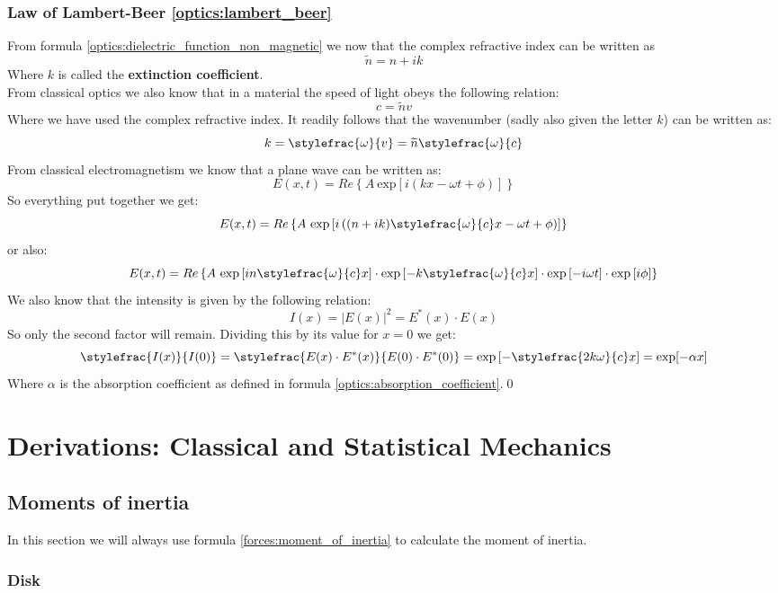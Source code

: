 	\subsection{Law of Lambert-Beer \ref{optics:lambert_beer}}
    From formula \ref{optics:dielectric_function_non_magnetic} we now that the complex refractive index can be written as \[\widetilde{n} = n+ik\]Where $k$ is called the \textbf{extinction coefficient}.
    \\From classical optics we also know that in a material the speed of light obeys the following relation: \[c = \widetilde{n}v\]Where we have used the complex refractive index. It readily follows that the wavenumber (sadly also given the letter $k$) can be written as:\[k = \stylefrac{\omega}{v} = \widetilde{n}\stylefrac{\omega}{c}\]
    From classical electromagnetism we know that a plane wave can be written as:\[E(x, t) = Re\left\{A\ \text{exp}\left[i(kx - \omega t + \phi)\right]\right\}\]
    So everything put together we get:\[E(x, t) = Re\left\{A\ \text{exp}\left[i\left((n+ik)\stylefrac{\omega}{c}x - \omega t + \phi\right)\right]\right\}\]
    or also:\[E(x, t) = Re\left\{A\ \text{exp}\left[in\stylefrac{\omega}{c}x\right]\cdot\text{exp}\left[-k\stylefrac{\omega}{c}x\right]\cdot\text{exp}\left[-i\omega t\right]\cdot\text{exp}\left[i\phi\right]\right\}\]
    We also know that the intensity is given by the following relation:\[I(x) = |E(x)|^2 = E^*(x)\cdot E(x)\]
    So only the second factor will remain. Dividing this by its value for $x=0$ we get:\[\stylefrac{I(x)}{I(0)} = \stylefrac{E(x)\cdot E^*(x)}{E(0)\cdot E^*(0)} = \text{exp}\left[-\stylefrac{2k\omega}{c}x\right] = \text{exp}[-\alpha x]\]
    Where $\alpha$ is the absorption coefficient as defined in formula \ref{optics:absorption_coefficient}.\qed

\chapter{Derivations: Classical and Statistical Mechanics}
\section{Moments of inertia}\label{deriv:inertia}

In this section we will always use formula \ref{forces:moment_of_inertia} to calculate the moment of inertia.
\subsection{Disk}
	
